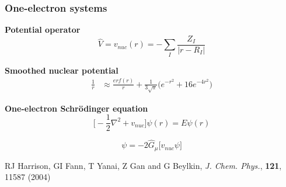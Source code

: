 \documentclass[mathserif, 10pt]{beamer}
\begin{document}
\begin{frame}
    \frametitle{One-electron systems}
    \centering
    \textbf{Potential operator}
    \begin{equation}
	\nonumber
	\hat{V} = v_{nuc}(r) = -\sum_I\frac{Z_I}{|r-R_I|}
    \end{equation}

    \vspace{5mm}

    \textbf{Smoothed nuclear potential}
    \begin{align}
	\nonumber
	\frac{1}{r} &\approx \frac{erf(r)}{r} +
	\frac{1}{3\sqrt{\pi}}\big(e^{-r^2}+16e^{-4r^2}\big)
    \end{align}

    \vspace{5mm}

    \textbf{One-electron Schr\"{o}dinger equation}
    \begin{equation}
        \nonumber
        \Big[-\frac{1}{2}\nabla^2 + v_{nuc}\Big]\psi(r) = E \psi(r)
    \end{equation}

    \vspace{1mm}

    \begin{equation}
        \nonumber
        \psi = -2\hat{G}_\mu \Big[v_{nuc} \psi \Big]
    \end{equation}

    \vspace{5mm}

    \centering
    \tiny
    RJ Harrison, GI Fann, T Yanai, Z Gan and G Beylkin,
    {\it J. Chem. Phys.}, 
    \textbf{121}, 11587
    (2004)
\end{frame}
\end{document}
